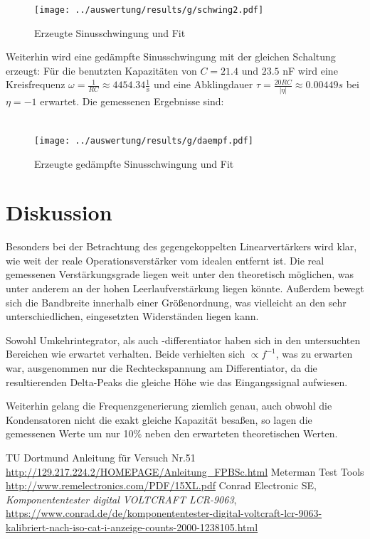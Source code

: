 \begin{figure}
	\centering
	\texttt{[image: ../auswertung/results/g/schwing2.pdf]}
	\caption{Erzeugte Sinusschwingung und Fit}
	\label{pic:g schwing}
\end{figure}

Weiterhin wird eine gedämpfte Sinusschwingung mit der gleichen Schaltung erzeugt: Für die benutzten Kapazitäten von $C = 21.4$ und $23.5$ nF wird eine Kreisfrequenz $\omega = \frac{1}{RC} \approx 4454.34 \frac{1}{\si{\second}}$ und eine Abklingdauer $\tau = \frac{20RC}{|\eta|} \approx 0.00449 \si{s}$ bei $\eta = -1$ erwartet. Die gemessenen Ergebnisse sind:

\begin{align*}
	
\end{align*}

\begin{figure}
	\centering
	\texttt{[image: ../auswertung/results/g/daempf.pdf]}
	\caption{Erzeugte gedämpfte Sinusschwingung und Fit}
\end{figure}


\section{Diskussion}
Besonders bei der Betrachtung des gegengekoppelten Linearvertärkers wird klar, wie weit der reale Operationsverstärker vom idealen entfernt ist. Die real gemessenen Verstärkungsgrade liegen weit unter den theoretisch möglichen, was unter anderem an der hohen Leerlaufverstärkung liegen könnte. Außerdem bewegt sich die Bandbreite innerhalb einer Größenordnung, was vielleicht an den sehr unterschiedlichen, eingesetzten Widerständen liegen kann.

Sowohl Umkehrintegrator, als auch -differentiator haben sich in den untersuchten Bereichen wie erwartet verhalten. Beide verhielten sich $\propto f^{-1}$, was zu erwarten war, ausgenommen nur die Rechteckspannung am Differentiator, da die resultierenden Delta-Peaks die gleiche Höhe wie das Eingangssignal aufwiesen.

Weiterhin gelang die Frequenzgenerierung ziemlich genau, auch obwohl die Kondensatoren nicht die exakt gleiche Kapazität  besaßen, so lagen die gemessenen Werte um nur 10\% neben den erwarteten theoretischen Werten.

\newpage
 \begin{thebibliography}{WissOnl}
 	 TU Dortmund Anleitung für Versuch Nr.51 \url{http://129.217.224.2/HOMEPAGE/Anleitung_FPBSc.html}
 	 Meterman Test Tools \url{http://www.remelectronics.com/PDF/15XL.pdf}
 	 Conrad Electronic SE, \textit{Komponententester digital VOLTCRAFT LCR-9063}, \url{https://www.conrad.de/de/komponententester-digital-voltcraft-lcr-9063-kalibriert-nach-iso-cat-i-anzeige-counts-2000-1238105.html}
 	\end{thebibliography}

